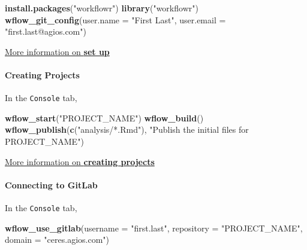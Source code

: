 \documentclass[openany]{article}
\newenvironment{Shaded}{\begin{snugshade}}{\end{snugshade}}
\newcommand{\DataTypeTok}[1]{\textcolor[rgb]{0.13,0.29,0.53}{#1}}
\newcommand{\KeywordTok}[1]{\textcolor[rgb]{0.13,0.29,0.53}{\textbf{#1}}}
\newcommand{\NormalTok}[1]{#1}
\newcommand{\StringTok}[1]{\textcolor[rgb]{0.31,0.60,0.02}{#1}}
\let\oldparagraph\paragraph
\renewcommand{\paragraph}[1]{\oldparagraph{#1}\mbox{}}
\begin{document}
\begin{Shaded}
\begin{Highlighting}[]
\KeywordTok{install.packages}\NormalTok{(}\StringTok{"workflowr"}\NormalTok{)}
\KeywordTok{library}\NormalTok{(}\StringTok{"workflowr"}\NormalTok{)}
\KeywordTok{wflow_git_config}\NormalTok{(}\DataTypeTok{user.name =} \StringTok{"First Last"}\NormalTok{, }\DataTypeTok{user.email =} \StringTok{"first.last@agios.com"}\NormalTok{)}
\end{Highlighting}
\end{Shaded}

\protect\hyperlink{installation}{More information on \textbf{set up}}

\hypertarget{creating-projects}{%
\paragraph{Creating Projects}\label{creating-projects}}

In the \texttt{Console} tab,

\begin{Shaded}
\begin{Highlighting}[]
\KeywordTok{wflow_start}\NormalTok{(}\StringTok{"PROJECT_NAME"}\NormalTok{)}
\KeywordTok{wflow_build}\NormalTok{()}
\KeywordTok{wflow_publish}\NormalTok{(}\KeywordTok{c}\NormalTok{(}\StringTok{"analysis/*.Rmd"}\NormalTok{), }\StringTok{"Publish the initial files for PROJECT_NAME"}\NormalTok{)}
\end{Highlighting}
\end{Shaded}

\protect\hyperlink{create-project}{More information on \textbf{creating projects}}

\hypertarget{connecting-to-gitlab}{%
\paragraph{Connecting to GitLab}\label{connecting-to-gitlab}}

In the \texttt{Console} tab,

\begin{Shaded}
\begin{Highlighting}[]
\KeywordTok{wflow_use_gitlab}\NormalTok{(}\DataTypeTok{username =} \StringTok{"first.last"}\NormalTok{, }\DataTypeTok{repository =} \StringTok{"PROJECT_NAME"}\NormalTok{, }\DataTypeTok{domain =} \StringTok{"ceres.agios.com"}\NormalTok{)}
\end{Highlighting}
\end{Shaded}
\end{document}
